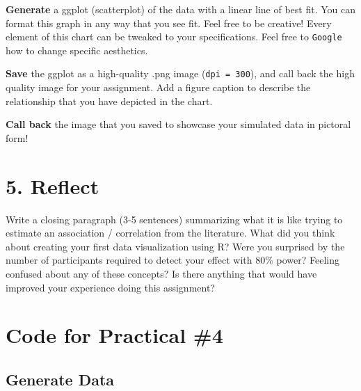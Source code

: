\documentclass[
]{book}
\newenvironment{Shaded}{\begin{snugshade}}{\end{snugshade}}
\newcommand{\AttributeTok}[1]{\textcolor[rgb]{0.13,0.29,0.53}{#1}}
\newcommand{\CommentTok}[1]{\textcolor[rgb]{0.56,0.35,0.01}{\textit{#1}}}
\newcommand{\ConstantTok}[1]{\textcolor[rgb]{0.56,0.35,0.01}{#1}}
\newcommand{\FunctionTok}[1]{\textcolor[rgb]{0.13,0.29,0.53}{\textbf{#1}}}
\newcommand{\NormalTok}[1]{#1}
\newcommand{\SpecialCharTok}[1]{\textcolor[rgb]{0.81,0.36,0.00}{\textbf{#1}}}
\begin{document}
\textbf{Generate} a ggplot (scatterplot) of the data with a linear line of best fit. You can format this graph in any way that you see fit. Feel free to be creative! Every element of this chart can be tweaked to your specifications. Feel free to \texttt{Google} how to change specific aesthetics.

\textbf{Save} the ggplot as a high-quality .png image (\texttt{dpi\ =\ 300}), and call back the high quality image for your assignment. Add a figure caption to describe the relationship that you have depicted in the chart.

\textbf{Call back} the image that you saved to showcase your simulated data in pictoral form!

\section*{5. Reflect}\label{reflect-3}

Write a closing paragraph (3-5 sentences) summarizing what it is like trying to estimate an association / correlation from the literature. What did you think about creating your first data visualization using R? Were you surprised by the number of participants required to detect your effect with 80\% power? Feeling confused about any of these concepts? Is there anything that would have improved your experience doing this assignment?

\section*{Code for Practical \#4}\label{code-for-practical-4}

\begin{Shaded}
\end{Shaded}

\subsection*{Generate Data}\label{generate-data}
\end{document}
